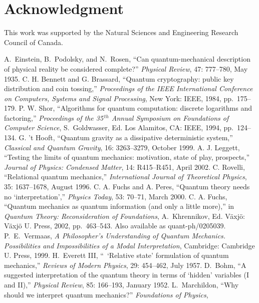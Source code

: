 \documentclass[12pt]{article}
\begin{document}
\section*{Acknowledgment}
%
This work was supported by the Natural Sciences
and Engineering Research Council of Canada.
%
\begin{thebibliography}{99}
%
 A.~Einstein, B.~Podolsky, and N.~Rosen,
``Can quantum-mechanical description of physical
reality be considered complete?''
\textit{Physical Review},
47: 777--780, May 1935.
%
 C. H. Bennett and G. Brassard,
``Quantum cryptography: public key distribution and coin tossing,''
\textit{Proceedings of the IEEE International Conference
on Computers, Systems and Signal Processing},
New York: IEEE, 1984, pp.~175--179.
%
 P. W. Shor,
``Algorithms for quantum computation: discrete
logarithms and factoring,''
\textit{Proceedings of the 35$^{\, th}$ Annual Symposium on
Foundations of Computer Science},
S.~Goldwasser, Ed.
Los Alamitos, CA: IEEE, 1994, pp.~124--134. 
%
 G. 't Hooft,
``Quantum gravity as a dissipative deterministic system,''
\textit{Classical and Quantum Gravity},
16: 3263--3279, October 1999.
%
 A. J. Leggett,
``Testing the limits of quantum mechanics:
motivation, state of play, prospects,''
\textit{Journal of Physics: Condensed Matter},
14: R415--R451, April 2002.
%
 C. Rovelli,
``Relational quantum mechanics,''
\textit{International Journal of Theoretical Physics},
35: 1637--1678, August 1996.
%
 C. A. Fuchs and A. Peres,
``Quantum theory needs no `interpretation',''
\textit{Physics Today},
53: 70--71, March 2000.
%
C. A. Fuchs,
``Quantum mechanics as quantum information
(and only a little more),'' in
\textit{Quantum Theory: Reconsideration of Foundations},
A.~Khrennikov, Ed.
V\"{a}xj\"{o}:  V\"{a}xj\"{o} U. Press, 2002, pp.~463--543. 
Also available as quant-ph/0205039.
%
 P.~E.~Vermaas,
\textit{A Philosopher's Understanding of Quantum
Mechanics.  Possibilities and Impossibilities
of a Modal Interpretation},
Cambridge: Cambridge U. Press, 1999.
%
 H.~Everett III,
``\, `Relative state' formulation of quantum mechanics,''
\textit{Reviews of Modern Physics},
29: 454--462, July 1957.
%
 D.~Bohm,
``A suggested interpretation of the quantum
theory in terms of `hidden' variables (I and II),''
\textit{Physical Review},
85: 166--193, January 1952.
%
 L.~Marchildon,
``Why should we interpret quantum mechanics?''
\textit{Foundations of Physics},

\end{thebibliography}
\end{document}
